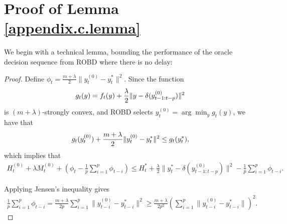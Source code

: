 \section{Proof of Lemma \ref{appendix.c.lemma}}\label{appendix.nonlinear+delay}
We begin with a technical lemma, bounding the performance of the oracle decision sequence from ROBD where there is no delay:
\begin{proof}
Define $\phi_t=\frac{m+\lambda}{2}\|y_t^{(0)}-y_t^*\|^2$. Since the function 
\begin{align}
    g_t(y)=f_t(y)+\frac{\lambda}{2}\|y-\delta(y_{t-1:t-p}^{(0)})\|^2\notag
\end{align}
is $(m+\lambda)$-strongly convex, and ROBD selects $y_t^{(0)}=\arg\min_yg_t(y)$, we have that
\begin{align}
    g_t(y_t^{(0)})+\frac{m+\lambda}{2}\|y_t^{(0)}-y_t^*\|^2\le g_t(y_t^*),\notag
\end{align}
which implies that
\begin{align}\label{appendix.nonlinear.lemma.1}
    H_t^{(0)}+\lambda M_t^{(0)}+\left(\phi_t-\frac{1}{p}\sum_{i=1}^p\phi_{t-i}\right)\le H_t^*+\frac{\lambda}{2}\|y_t^*-\delta(y_{t-1:t-p}^{(0)})\|^2-\frac{1}{p}\sum_{i=1}^p\phi_{t-i}.
\end{align}

Applying Jensen's inequality gives
\begin{align}\label{appendix.c.psi}
    \frac{1}{p}\sum_{i=1}^p\phi_{t-i}
    =\frac{m+\lambda}{2p}\sum_{i=1}^p\|y_{t-i}^{(0)}-y_{t-i}^*\|^2
    \ge\frac{m+\lambda}{2p^2}\left(\sum_{i=1}^p\|y_{t-i}^{(0)}-y_{t-i}^*\|\right)^2.
\end{align}


\end{proof}
